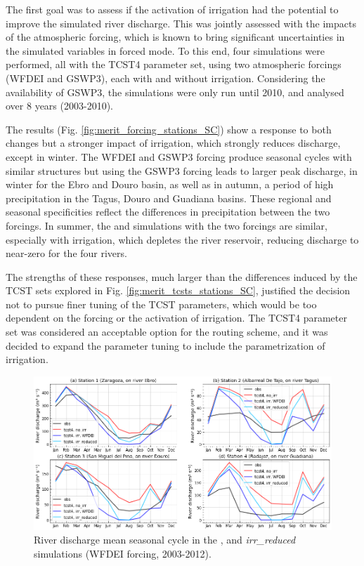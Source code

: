 The first goal was to assess if the activation of irrigation had the potential to improve the simulated river discharge. This was jointly assessed with the impacts of the atmospheric forcing, which is known to bring significant uncertainties in the simulated variables in forced mode.  
To this end,  four simulations were performed, all with the TCST4 parameter set, using two atmospheric forcings (WFDEI and GSWP3), each with and without irrigation. Considering the availability of GSWP3, the simulations were only run until 2010, and analysed over 8 years (2003-2010).

The results (Fig. \ref{fig:merit_forcing_stations_SC}) show a response to both changes but a stronger impact of irrigation, which strongly reduces discharge, except in winter. The WFDEI and GSWP3 forcing produce seasonal cycles with similar structures but using the GSWP3 forcing leads to larger peak discharge, in winter for the Ebro and Douro basin, as well as in autumn, a period of high precipitation in the Tagus, Douro and Guadiana basins. These regional and seasonal specificities reflect the differences in precipitation between the two forcings. 
In summer, the \noirr and \irr simulations with the two forcings are similar, especially with irrigation, which depletes the river reservoir, reducing discharge to near-zero for the four rivers.

The strengths of these responses, much larger than the differences induced by the TCST sets explored in Fig. \ref{fig:merit_tcsts_stations_SC}, justified the decision not to pursue finer tuning of the TCST parameters, which would be too dependent on the forcing or the activation of irrigation. The TCST4 parameter set was considered an acceptable option for the routing scheme, and it was decided to expand the parameter tuning to include the parametrization of irrigation. 

\begin{figure}[htbp]
    \centering
    \includegraphics[width=\textwidth]{images/chap3/river_discharge/merit_irr_4stations_SC.png}
    \caption{River discharge mean seasonal cycle  in the \noirr, \irr and \textit{irr\_reduced} simulations (WFDEI forcing, 2003-2012).}
    \label{fig:merit_irr_stations_SC}
\end{figure}

